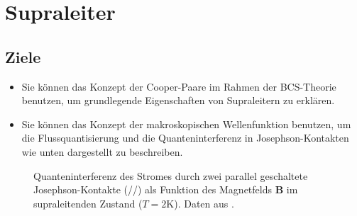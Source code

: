 \renewcommand{\chapterauthors}{Markus Lippitz}
\renewcommand{\lastmod}{20. Juni 2023}

\chapter{Supraleiter}




\section{Ziele}
 


\begin{itemize}
\item Sie können das Konzept der Cooper-Paare im Rahmen der BCS-Theorie benutzen, um grundlegende Eigenschaften von Supraleitern zu erklären.
\item Sie können das Konzept der makroskopischen Wellenfunktion benutzen, um die Flussquantisierung und die Quanteninterferenz in Josephson-Kontakten wie unten dargestellt zu beschreiben.
\end{itemize}

\begin{figure}
    \caption{Quanteninterferenz des Stromes durch zwei parallel geschaltete Josephson-Kontakte (//) als Funktion des Magnetfelds $\bm{B}$ im supraleitenden Zustand ($T=2$K). Daten aus \cite{Jaklevic1965}. \label{fig:6_squid_data}
}
\end{figure}


 


 




